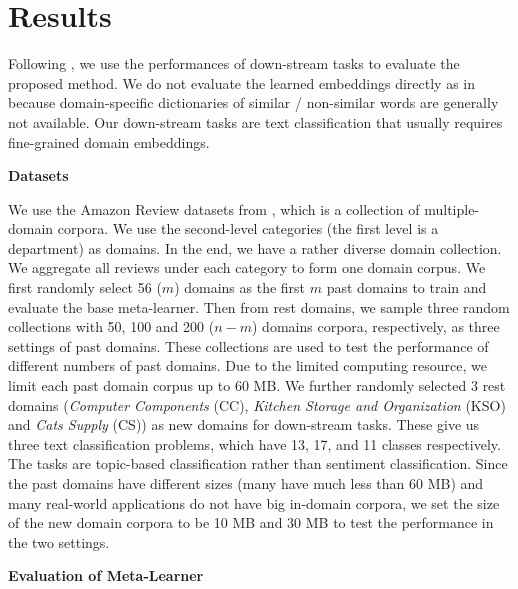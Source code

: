\section{Results}
\label{chap3:sec:exp}

Following \cite{nayak2016evaluating},
we use the performances of down-stream tasks to evaluate the proposed method. 
We do not evaluate the learned embeddings directly as in \cite{mikolov2013distributed,pennington2014glove} because domain-specific dictionaries of similar / non-similar words are generally not available. Our down-stream tasks are text classification that usually requires fine-grained domain embeddings.

\textbf{Datasets}

We use the Amazon Review datasets from \cite{HeMcA16a}, which is a collection of multiple-domain corpora. We use the second-level categories (the first level is a department) as domains.
In the end, we have a rather diverse domain collection. 
We aggregate all reviews under each category to form one domain corpus. 
We first randomly select 56 ($m$) domains as the first $m$ past domains to train and evaluate the base meta-learner.
Then from rest domains, we sample three random collections with 50, 100 and 200 ($n-m$) domains corpora, respectively, as three settings of past domains.
These collections are used to test the performance of different numbers of past domains.
Due to the limited computing resource, we limit each past domain corpus up to 60 MB.
We further randomly selected 3 rest domains (\emph{Computer Components} (CC), \emph{Kitchen Storage and Organization} (KSO) and \emph{Cats Supply} (CS)) as new domains for down-stream tasks. These give us three text classification problems, which have 13, 17, and 11 classes respectively. The tasks are topic-based classification rather than sentiment classification. 
Since the past domains have different sizes (many have much less than 60 MB) and many real-world applications do not have big in-domain corpora, we set the size of the new domain corpora to be 10 MB and 30 MB to test the performance in the two settings.

\textbf{Evaluation of Meta-Learner}

